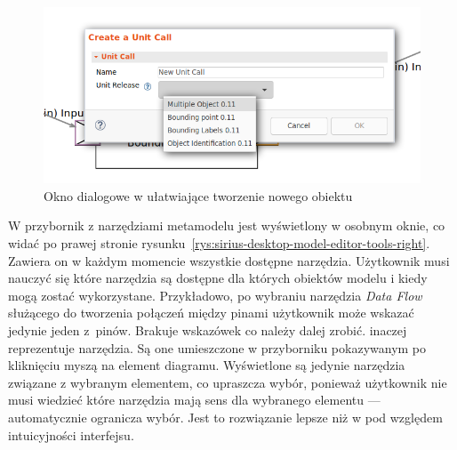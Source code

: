\begin{figure}[t]
  \centering

  \includegraphics[width=0.95\linewidth]{./images/sirius-desktop-create-unit-call-dialog.png}
  \caption{Okno dialogowe w \SiriusDesktop{} ułatwiające tworzenie nowego
    obiektu}\label{rys:sirius-desktop-create-unit-call-dialog}
\end{figure}

W \SiriusDesktop{} przybornik z narzędziami metamodelu jest wyświetlony
w osobnym oknie, co widać po prawej stronie
rysunku~\ref{rys:sirius-desktop-model-editor-tools-right}. Zawiera on w każdym
momencie wszystkie dostępne narzędzia.
Użytkownik musi nauczyć się które narzędzia są dostępne dla których obiektów
modelu i kiedy mogą zostać wykorzystane. Przykładowo, po wybraniu narzędzia
\emph{Data Flow} służącego do tworzenia połączeń między pinami użytkownik może
wskazać jedynie jeden z~pinów. Brakuje wskazówek co należy dalej zrobić.
\SiriusWeb{} inaczej reprezentuje narzędzia. Są one umieszczone w
przyborniku pokazywanym po kliknięciu myszą na element diagramu. Wyświetlone są
jedynie narzędzia związane z wybranym elementem, co upraszcza wybór, ponieważ
użytkownik nie musi wiedzieć które narzędzia mają sens dla wybranego elementu
--- \SiriusWeb{} automatycznie ogranicza wybór. Jest to rozwiązanie lepsze
niż w \SiriusDesktop{} pod względem intuicyjności interfejsu.

